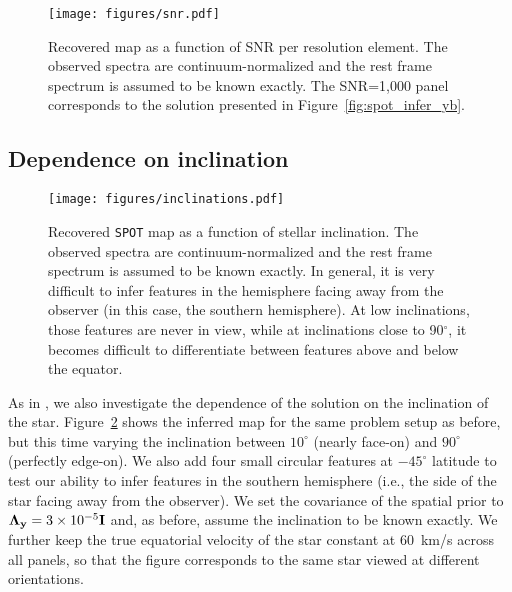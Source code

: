 \documentclass[modern]{aastex631}
\begin{document}
%
\begin{figure}[t!]
    \begin{centering}
        \texttt{[image: figures/snr.pdf]}
        \caption{%
            Recovered \spot map as a function of SNR per resolution element. 
            The observed spectra are continuum-normalized and the rest frame spectrum is assumed to be known exactly.
            The SNR=1,000 panel corresponds to the solution presented in Figure~\ref{fig:spot_infer_yb}.
        }
        \label{fig:snr}
    \end{centering}
\end{figure}


\subsection{Dependence on inclination}
\label{sec:inc}
%
\begin{figure}[t!]
    \begin{centering}
        \texttt{[image: figures/inclinations.pdf]} %
        \caption{%
            Recovered \texttt{SPOT} map as a function of stellar inclination. 
            The observed spectra are continuum-normalized and the rest frame spectrum is assumed to be known exactly.
            In general, it is very difficult to infer features in the hemisphere facing away from the observer (in this case, the southern hemisphere). 
            At low inclinations, those features are never in view, while at inclinations close to 90$^\circ$, it becomes difficult to differentiate between features above and below the equator.
        }
        \label{fig:inclinations}
    \end{centering}
\end{figure}
%
As in \citet{Vogt1987}, we also investigate the dependence of the solution on the inclination of the star.
Figure~\ref{fig:inclinations} shows the inferred map for the same problem setup as before, but this time varying the inclination between $10^\circ$ (nearly face-on) and $90^\circ$ (perfectly edge-on). 
We also add four small circular features at $-45^\circ$ latitude to test our ability to infer features in the southern hemisphere (i.e., the side of the star facing away from the observer).
We set the covariance of the spatial prior to $\boldsymbol{\Lambda}_{\mathbf{y}} = 3\times 10^{-5}{\mathbf{I}}$ and, as before, assume the inclination to be known exactly. 
We further keep the true equatorial velocity of the star constant at $60$~km/s across all panels, so that the figure corresponds to the same star viewed at different orientations. 
\end{document}
